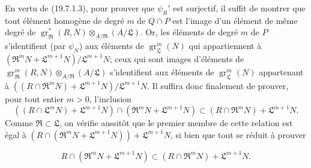 \begin{env}[19.7.1.5]
\label{IV.19.7.1.5}
En vertu de (19.7.1.3), pour prouver que $\psi_R'$ est surjectif, il suffit de montrer que tout élément homogène de degré $m$ de $Q\cap P$ est l'image d'un élément de même degré de $\operatorname{gr}_{\mathfrak R}^*(R,N)\otimes_{A/\mathfrak R}(A/\mathfrak L)$. Or, les éléments de degré $m$ de $P$ s'identifient (par $\psi_N$) aux éléments de $\operatorname{gr}_{\mathfrak L}^m(N)$ qui appartiennent à $(\mathfrak R^mN+\mathfrak L^{m+1}N)/\mathfrak L^{m+1}N$; ceux qui sont images d'éléments de $\operatorname{gr}_{\mathfrak R}^m(R,N)\otimes_{A/\mathfrak R}(A/\mathfrak L)$ s'identifient aux éléments de $\operatorname{gr}_{\mathfrak L}^m(N)$ appartenant à $((R\cap\mathfrak R^mN)+\mathfrak L^{m+1}N)/\mathfrak L^{m+1}N$. Il suffira donc finalement de prouver, pour tout entier $m>0$, l'inclusion
\[
  ((R\cap\mathfrak L^mN)+\mathfrak L^{m+1}N)\cap(\mathfrak R^mN+\mathfrak L^{m+1}N)\subset(R\cap\mathfrak R^mN)+\mathfrak L^{m+1}N.
\]
Comme $\mathfrak R\subset\mathfrak L$, on vérifie aussitôt que le premier membre de cette relation est égal à $(R\cap(\mathfrak R^mN+\mathfrak L^{m+1}N))+\mathfrak L^{m+1}N$, si bien que tout se réduit à prouver
\end{env}

\begin{env}[19.7.1.6]
\label{IV.19.7.1.6}
\[
  R\cap(\mathfrak R^mN+\mathfrak L^{m+1}N)\subset(R\cap\mathfrak R^mN)+\mathfrak L^{m+1}N.
\]
\end{env}

